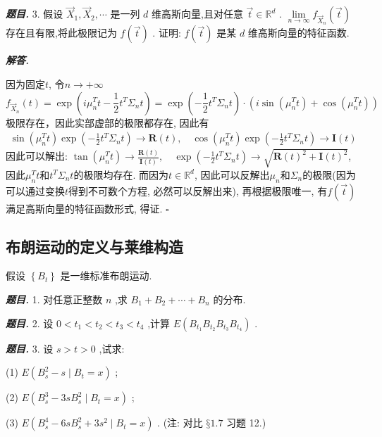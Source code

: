 \documentclass[10pt, a4paper, oneside]{ctexart}
\newenvironment{problem}{\begin{framed}\par\noindent\textbf{\textit{题目. }}}{\end{framed}\par}
\newenvironment{solution}{%
  \par\noindent\textbf{\textit{解答. }}\ignorespaces
}{%
  \hfill\ensuremath{\square}\par %
}
\begin{document}
\begin{problem}
    3. 假设 \( {\overrightarrow{X}}_{1},{\overrightarrow{X}}_{2},\cdots  \) 是一列 \( d \) 维高斯向量,且对任意 \( \overrightarrow{t} \in  {\mathbb{R}}^{d} \) . \( \mathop{\lim }\limits_{{n \rightarrow  \infty }}{f}_{{\overrightarrow{X}}_{n}}\left( \overrightarrow{t}\right)  \) 存在且有限,将此极限记为 \( f\left( \overrightarrow{t}\right)  \) . 证明: \( f\left( \overrightarrow{t}\right)  \) 是某 \( d \) 维高斯向量的特征函数.
\end{problem}
\begin{solution}
    因为固定$t$, 令$n\to +\infty$
    $$f_{\vec{X}_n}(t)=\exp(i\mu_n^Tt-\frac{1}{2}t^T\Sigma_nt)=\exp(-\frac{1}{2}t^T\Sigma_nt)\cdot (i\sin (\mu_n^Tt)+\cos(\mu_n^Tt))$$
    极限存在，因此实部虚部的极限都存在, 因此有
    \begin{align*}
        \sin (\mu_n^Tt)\exp(-\frac{1}{2}t^T\Sigma_nt)\to \mathbf{R}(t),\quad \cos (\mu_n^Tt)\exp(-\frac{1}{2}t^T\Sigma_nt)\to \mathbf{I}(t)
    \end{align*}
    因此可以解出: $\tan(\mu_n^Tt)\to \frac{\mathbf{R}(t)}{\mathbf{I}(t)},\quad \exp(-\frac{1}{2}t^T\Sigma_nt) \to \sqrt{\mathbf{R}(t)^2+\mathbf{I}(t)^2}$, 因此$\mu_n^Tt$和$t^T\Sigma_nt$的极限均存在. 而因为$t\in \mathbb{R}^d$, 因此可以反解出$\mu_n$和$\Sigma_n$的极限(因为可以通过变换$t$得到不可数个方程, 必然可以反解出来), 再根据极限唯一, 有$f(\vec{t})$满足高斯向量的特征函数形式, 得证.
\end{solution}

\subsection{布朗运动的定义与莱维构造}
假设 \( \left\{  {B}_{t}\right\}   \) 是一维标准布朗运动.
\begin{problem}
    1. 对任意正整数 \( n \) ,求 \( {B}_{1} + {B}_{2} + \cdots  + {B}_{n} \) 的分布.
\end{problem}

\begin{problem}
    2. 设 \( 0 < {t}_{1} < {t}_{2} < {t}_{3} < {t}_{4} \) ,计算 \( E\left( {{B}_{{t}_{1}}{B}_{{t}_{2}}{B}_{{t}_{3}}{B}_{{t}_{4}}}\right)  \) . 
\end{problem}

\begin{problem}
    3. 设 \( s > t > 0 \) ,试求:

(1) \( E\left( {{B}_{s}^{2} - s \mid  {B}_{t} = x}\right)  \) ;

(2) \( E\left( {{B}_{s}^{3} - {3s}{B}_{s}^{2} \mid  {B}_{t} = x}\right)  \) ;

(3) \( E\left( {{B}_{s}^{4} - {6s}{B}_{s}^{2} + 3{s}^{2} \mid  {B}_{t} = x}\right)  \) . (注: 对比 \( §{1.7} \) 习题 12.)
\end{problem}
\end{document}
